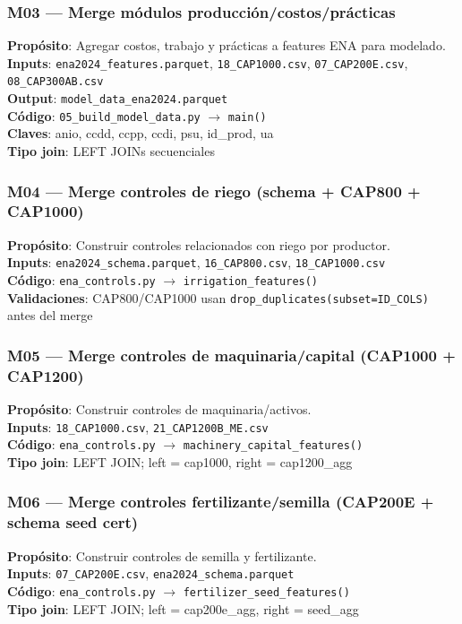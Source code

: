 \documentclass[11pt,a4paper]{article}
\begin{document}
\subsubsection{M03 — Merge módulos producción/costos/prácticas}
\textbf{Propósito}: Agregar costos, trabajo y prácticas a features ENA para modelado.\\
\textbf{Inputs}: \texttt{ena2024\_features.parquet}, \texttt{18\_CAP1000.csv}, \texttt{07\_CAP200E.csv}, \texttt{08\_CAP300AB.csv}\\
\textbf{Output}: \texttt{model\_data\_ena2024.parquet}\\
\textbf{Código}: \texttt{05\_build\_model\_data.py} $\to$ \texttt{main()}\\
\textbf{Claves}: anio, ccdd, ccpp, ccdi, psu, id\_prod, ua\\
\textbf{Tipo join}: LEFT JOINs secuenciales

\subsubsection{M04 — Merge controles de riego (schema + CAP800 + CAP1000)}
\textbf{Propósito}: Construir controles relacionados con riego por productor.\\
\textbf{Inputs}: \texttt{ena2024\_schema.parquet}, \texttt{16\_CAP800.csv}, \texttt{18\_CAP1000.csv}\\
\textbf{Código}: \texttt{ena\_controls.py} $\to$ \texttt{irrigation\_features()}\\
\textbf{Validaciones}: CAP800/CAP1000 usan \texttt{drop\_duplicates(subset=ID\_COLS)} antes del merge

\subsubsection{M05 — Merge controles de maquinaria/capital (CAP1000 + CAP1200)}
\textbf{Propósito}: Construir controles de maquinaria/activos.\\
\textbf{Inputs}: \texttt{18\_CAP1000.csv}, \texttt{21\_CAP1200B\_ME.csv}\\
\textbf{Código}: \texttt{ena\_controls.py} $\to$ \texttt{machinery\_capital\_features()}\\
\textbf{Tipo join}: LEFT JOIN; left = cap1000, right = cap1200\_agg

\subsubsection{M06 — Merge controles fertilizante/semilla (CAP200E + schema seed cert)}
\textbf{Propósito}: Construir controles de semilla y fertilizante.\\
\textbf{Inputs}: \texttt{07\_CAP200E.csv}, \texttt{ena2024\_schema.parquet}\\
\textbf{Código}: \texttt{ena\_controls.py} $\to$ \texttt{fertilizer\_seed\_features()}\\
\textbf{Tipo join}: LEFT JOIN; left = cap200e\_agg, right = seed\_agg
\end{document}

